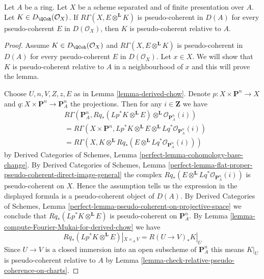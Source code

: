 \begin{lemma}
\label{lemma-characterize-pseudo-coherent}
Let $A$ be a ring. Let $X$ be a scheme separated and
of finite presentation over $A$. Let $K \in D_\QCoh(\mathcal{O}_X)$.
If $R\Gamma(X, E \otimes^\mathbf{L} K)$ is pseudo-coherent
in $D(A)$ for every pseudo-coherent $E$ in $D(\mathcal{O}_X)$,
then $K$ is pseudo-coherent relative to $A$.
\end{lemma}

\begin{proof}
Assume $K \in D_\QCoh(\mathcal{O}_X)$ and
$R\Gamma(X, E \otimes^\mathbf{L} K)$ is pseudo-coherent
in $D(A)$ for every pseudo-coherent $E$ in $D(\mathcal{O}_X)$.
Let $x \in X$. We will show that $K$ is pseudo-coherent relative to $A$
in a neighbourhood of $x$ and this will prove the lemma.

\medskip\noindent
Choose $U, n, V, Z, z, E$ as in Lemma \ref{lemma-derived-chow}.
Denote $p : X \times \mathbf{P}^n \to X$ and
$q : X \times \mathbf{P}^n \to \mathbf{P}^n_A$
the projections.
Then for any $i \in \mathbf{Z}$ we have
\begin{align*}
& R\Gamma(\mathbf{P}^n_A,
Rq_*(Lp^*K \otimes^\mathbf{L} E)
\otimes^\mathbf{L}
\mathcal{O}_{\mathbf{P}^n_A}(i)) \\
& =
R\Gamma(X \times \mathbf{P}^n,
Lp^*K \otimes^\mathbf{L} E \otimes^\mathbf{L}
Lq^*\mathcal{O}_{\mathbf{P}^n_A}(i)) \\
& =
R\Gamma(X,
K \otimes^\mathbf{L} Rq_*(E \otimes^\mathbf{L}
Lq^*\mathcal{O}_{\mathbf{P}^n_A}(i)))
\end{align*}
by 
Derived Categories of Schemes,
Lemma \ref{perfect-lemma-cohomology-base-change}.
By
Derived Categories of Schemes,
Lemma \ref{perfect-lemma-flat-proper-pseudo-coherent-direct-image-general}
the complex $Rq_*(E \otimes^\mathbf{L} Lq^*\mathcal{O}_{\mathbf{P}^n_A}(i))$
is pseudo-coherent on $X$. Hence the assumption tells us the expression
in the displayed formula is a pseudo-coherent object of $D(A)$.
By
Derived Categories of Schemes,
Lemma \ref{perfect-lemma-pseudo-coherent-on-projective-space}
we conclude that $Rq_*(Lp^*K \otimes^\mathbf{L} E)$ is
pseudo-coherent on $\mathbf{P}^n_A$.
By Lemma \ref{lemma-compute-Fourier-Mukai-for-derived-chow}
we have
$$
Rq_*(Lp^*K \otimes^\mathbf{L} E)|_{X \times_A V} =
R(U \to V)_*K|_U
$$
Since $U \to V$ is a closed immersion into an open subscheme of
$\mathbf{P}^n_A$ this means $K|_U$ is pseudo-coherent relative to $A$
by Lemma \ref{lemma-check-relative-pseudo-coherence-on-charts}.
\end{proof}







